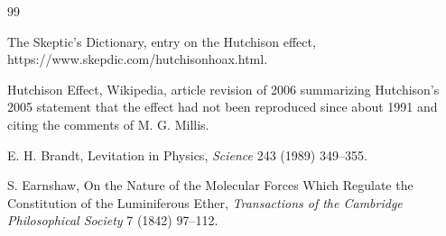 \documentclass[11pt]{article}
\begin{document}
\begin{thebibliography}{99}

 The Skeptic's Dictionary, entry on the Hutchison effect, https://www.skepdic.com/hutchisonhoax.html.

 Hutchison Effect, Wikipedia, article revision of 2006 summarizing Hutchison's 2005 statement that the effect had not been reproduced since about 1991 and citing the comments of M. G. Millis.

 E. H. Brandt, Levitation in Physics, \emph{Science} 243 (1989) 349--355.

 S. Earnshaw, On the Nature of the Molecular Forces Which Regulate the Constitution of the Luminiferous Ether, \emph{Transactions of the Cambridge Philosophical Society} 7 (1842) 97--112.

\end{thebibliography}
\end{document}
